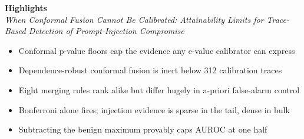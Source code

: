 \documentclass[11pt]{article}
\begin{document}
\begin{center}
{\large\bfseries Highlights}\\[0.5em]
\emph{When Conformal Fusion Cannot Be Calibrated: Attainability Limits
for Trace-Based Detection of Prompt-Injection Compromise}
\end{center}
\vspace{1em}
\begin{itemize}\itemsep0.5em
\item Conformal p-value floors cap the evidence any e-value calibrator can express
\item Dependence-robust conformal fusion is inert below 312 calibration traces
\item Eight merging rules rank alike but differ hugely in a-priori false-alarm control
\item Bonferroni alone fires; injection evidence is sparse in the tail, dense in bulk
\item Subtracting the benign maximum provably caps AUROC at one half
\end{itemize}
\end{document}
